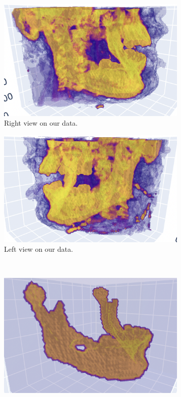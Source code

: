 \begin{figure}
	\centering
	\begin{subfigure}{0.3\linewidth}
		\centering
		\includegraphics[width=\linewidth]{Materials/L3D}
		\caption{Right view on our data.}
	\end{subfigure}
	\hspace{1cm}
	\begin{subfigure}{0.3\linewidth}
		\centering
		\includegraphics[width=\linewidth]{Materials/R3D}
		\caption{Left view on our data.\newline}
	\end{subfigure}
	\\
	\begin{subfigure}{0.3\linewidth}
		\centering
		\includegraphics[width=\linewidth]{Materials/L3DSeg}

\end{subfigure}
\end{figure}

